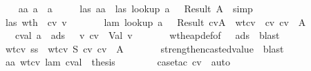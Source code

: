 \begin{isabellebody}
\ \ \isamarkupfalse \isanewline
\ \ \ \ \isamarkupfalse \ aa{\isacharcolon}\ {\isachardoublequoteopen}a{\isacharprime}\ {\isasymnoteq}\ a{\isachardoublequoteclose}\isanewline
\ \ \ \ \isamarkupfalse \ las{}\ aa\ \isamarkupfalse \ las{}{\isacharcolon}\ {\isachardoublequoteopen}lookup\ a{\isacharprime}\ {\isasymSigma}\ {\isacharequal}\ Result\ A{\isacharprime}{\isachardoublequoteclose}\ \isamarkupfalse \ simp\isanewline
\ \ \ \ \isamarkupfalse \ las{}\ wth\ \isamarkupfalse \ cv{\isacharprime}\ v{\isacharprime}\ \isanewline
\ \ \ \ \ \ lam{}{\isacharcolon}\ {\isachardoublequoteopen}lookup\ a{\isacharprime}\ {\isasymmu}\ {\isacharequal}\ Result\ {\isacharparenleft}cv{\isacharprime}{\isacharcomma}A{\isacharprime}{\isacharparenright}{\isachardoublequoteclose}\ \ wtcv{}{\isacharcolon}\ {\isachardoublequoteopen}{\isasymSigma}\ {\isasymturnstile}cv\ cv{\isacharprime}\ {\isacharcolon}\ A{\isacharprime}{\isachardoublequoteclose}\ \isanewline
\ \ \ \ \ \ \ cval{\isacharcolon}\ {\isachardoublequoteopen}a{\isacharprime}\ {\isasymnotin}\ ads\ {\isasymlongrightarrow}\ {\isacharparenleft}{\isasymexists}\ v{\isachardot}\ cv{\isacharprime}\ {\isacharequal}\ Val\ v{\isacharparenright}{\isachardoublequoteclose}\isanewline
\ \ \ \ \ \ \isamarkupfalse \ wt{\isacharunderscore}heap{\isacharunderscore}def{\isacharbrackleft}of\ {\isasymSigma}\ {\isasymmu}\ ads{\isacharbrackright}\ \isamarkupfalse \ blast\ \isamarkupfalse \isanewline
\ \ \ \ \isamarkupfalse \ wtcv{}\ ss\ \isamarkupfalse \ wtcv{}{\isacharcolon}\ {\isachardoublequoteopen}{\isacharquery}S{}\ {\isasymturnstile}cv\ cv{\isacharprime}\ {\isacharcolon}\ A{\isacharprime}{\isachardoublequoteclose}\isanewline
\ \ \ \ \ \ \isamarkupfalse \ strengthen{\isacharunderscore}casted{\isacharunderscore}value\ \isamarkupfalse \ blast\isanewline
\ \ \ \ \isamarkupfalse \ aa\ wtcv{}\ lam{}\ cval\ \isamarkupfalse \ {\isacharquery}thesis\ \isanewline
\ \ \ \ \ \ \isamarkupfalse \ {\isacharparenleft}case{\isacharunderscore}tac\ cv{\isacharparenright}\ \isamarkupfalse \ auto\ \isamarkupfalse \isanewline
\ \ \isamarkupfalse \isanewline
{}\isamarkupfalse \isanewline

\end{isabellebody}
